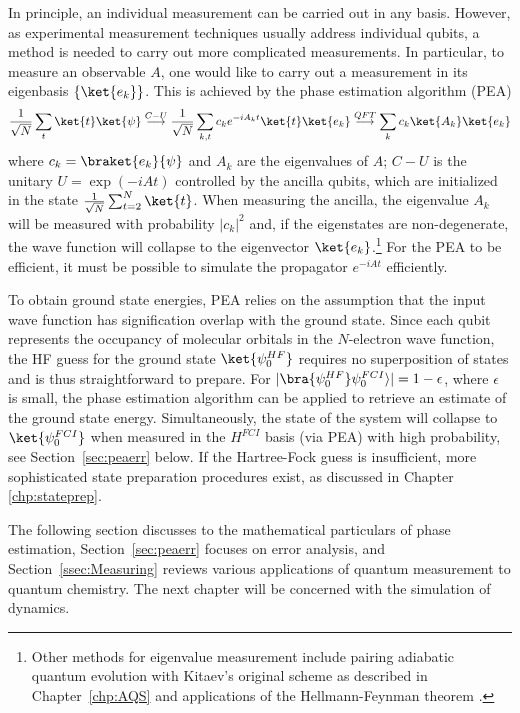 \documentclass[11pt,oneside,final]{huthesis}%
\begin{document}
In principle, an individual measurement can be carried out in any basis.
However, as experimental measurement techniques usually address individual
qubits, a method is needed to carry out more complicated measurements. In
particular, to measure an observable $A$, one would like to carry out a
measurement in its eigenbasis $\{\ket{e_k}\}$. This is achieved by the phase
estimation algorithm (PEA)  \cite{Kitaev95,Abrams99}
\begin{equation}
\frac{1}{\sqrt{N}} \sum_t \ket{t}\ket{\psi} \stackrel{C{-}U}{\longrightarrow}
\frac{1}{\sqrt{N}} \sum_{k,t} {c_k e^{ - iA_k t} } \ket{t}\ket{e_k }
\stackrel{QFT}{\longrightarrow}
\sum_k c_k\ket{A_k}\ket{e_k}
\label{eq:PEA}
\end{equation}
where $c_k  = \braket{e_k }{\psi}$ and $A_k$ are the eigenvalues of $A$; $C{-}U$
is the unitary $U=\exp(-iAt)$ controlled by the ancilla qubits, which are
initialized in the state $\frac{1}{\sqrt{N}} \sum_{t=2}^N\ket{t}$.  When measuring the
ancilla, the eigenvalue $A_k$ will be measured with probability ${\left|c_k\right|^2 }$
and, if the eigenstates are non-degenerate, the wave function will
collapse to the eigenvector $\ket{e_k}$.\footnote{Other methods for eigenvalue
measurement include pairing adiabatic quantum evolution with Kitaev's original
scheme as described in Chapter~\ref{chp:AQS} and applications of the Hellmann-Feynman theorem
\cite{Oh08}.}  For the PEA to be efficient, it must be possible to simulate
the propagator $e^{-iAt}$ efficiently. 

To obtain ground state energies, PEA relies on the assumption that the input wave function has signification overlap with the ground state. Since each qubit represents the occupancy of molecular orbitals in the $N$-electron wave function, the HF guess for the ground state $\ket{\psi_0^{HF}}$ requires no superposition of states and is thus straightforward to prepare. For $|\bra{\psi_0^{HF}}\psi_0^{FCI}\rangle|=1-\epsilon$, where $\epsilon$ is small, the phase estimation algorithm can be applied to retrieve an estimate of the ground state energy.  Simultaneously, the state of the system will collapse to $\ket{\psi_0^{FCI}}$ when measured in the $H^{FCI}$ basis (via PEA) with high probability, see Section~\ref{sec:peaerr} below. If the Hartree-Fock guess is insufficient, more sophisticated state preparation procedures exist, as discussed in Chapter \ref{chp:stateprep}. 

The following section discusses to the mathematical particulars of phase estimation, Section~\ref{sec:peaerr} focuses on error analysis, and Section~\ref{ssec:Measuring} reviews various applications of quantum measurement to quantum chemistry.  The next chapter will be concerned with the simulation of dynamics.
\end{document}
